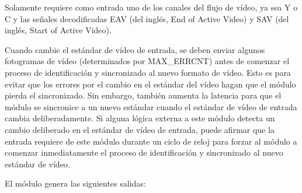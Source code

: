 Solamente requiere como entrada uno de los canales del flujo de vídeo, ya sea Y
o C y las señales decodificadas EAV  (del inglés, End of Active Video) y SAV (del inglés, Start of Active Video)\@.

Cuando cambie el estándar de vídeo de entrada, se deben enviar algunos fotogramas
de vídeo (determinados por MAX\_ERRCNT) antes de comenzar el proceso de
identificación y sincronizado al nuevo formato de vídeo. Esto es para evitar que los
errores por el cambio en el estándar del vídeo hagan que el módulo pierda el
sincronizado. Sin embargo, también aumenta la latencia para que el módulo se sincronice a
un nuevo estándar cuando el estándar de vídeo de entrada cambia deliberadamente.
Si alguna lógica externa a este módulo detecta un cambio deliberado
en el estándar de vídeo de entrada, puede afirmar que la entrada requiere de este
módulo durante un ciclo de reloj para forzar al módulo a comenzar inmediatamente
el proceso de identificación y sincronizado al nuevo estándar de vídeo.

El módulo genera las siguientes salidas:

